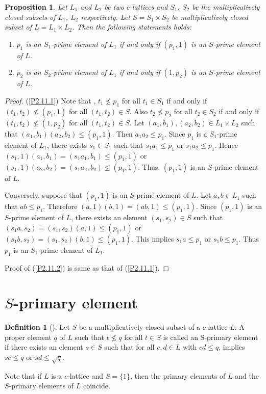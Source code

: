 \documentclass[10pt,twoside,a4paper]{amsart}
\numberwithin{equation}{section}
\theoremstyle{plain}
\newtheorem{prop}[lem]{Proposition}
\theoremstyle{definition}
\newtheorem{defn}[lem]{Definition}
\begin{document}
\begin{prop}%
	Let $L_1$ and $L_2$ be two $c$-lattices and $S_1$, $S_2$ be the multiplicatively closed subsets of $L_1$, $L_2$ respectively. Let $S=S_1\times S_2$ be multiplicatively closed subset of  $L=L_1\times L_2$. Then the following statements holds:
	\begin{enumerate}
		\item\label{P2.11.1} $p_1$ is an $S_1$-prime element of $L_1$ if and only if $(p_1,1)$ is an $S$-prime element of $L$.
		\item\label{P2.11.2} $p_2$ is an $S_2$-prime element of $L_1$ if and only if $(1,p_2)$ is an $S$-prime element of $L$.
	\end{enumerate}
\end{prop}    
\begin{proof} 
	(\ref{P2.11.1})	Note that , $t_1\nleq p_1$ for all $t_1\in S_1$ if and only if $(t_1,t_2)\nleq (p_1,1)$ for all $(t_1,t_2) \in S$. Also $t_2 \nleq p_2$ for all $t_2 \in S_2$ if and only if $(t_1,t_2) \nleq (1,p_2)$ for all $(t_1,t_2) \in S$. Let $(a_1,b_1), (a_2,b_2)\in L_1\times L_2$ such that $(a_1,b_1)(a_2,b_2)\leq (p_1,1)$. Then $a_1a_2\leq p_1$. Since $p_1$ is a $S_1$-prime element of $L_1$, there exists $s_1\in S_1$ such that $s_1a_1\leq p_1$ or $s_1a_2\leq p_1$. Hence $(s_1,1)(a_1,b_1)=(s_1a_1,b_1)\leq (p_1,1)$ or $(s_1,1)(a_2,b_2)=(s_1a_2,b_2)\leq (p_1,1)$. Thus, $(p_1,1)$ is an $S$-prime element of $L$.
	
	Conversely, suppose that $(p_1,1)$ is an $S$-prime element of $L$. Let $a,b\in L_1$ such that $ab\leq p_1$. Therefore $(a,1)(b,1)=(ab,1)\leq (p_1,1)$. Since $(p_1,1)$ is an $S$-prime element of $L$, there exists an element $(s_1,s_2)\in S$ such that $(s_1a,s_2)=(s_1,s_2)(a,1)\leq (p_1,1)$ or $(s_1b,s_2)=(s_1,s_2)(b,1)\leq (p_1,1)$. This implies $s_1a\leq p_1$ or $s_1b\leq p_1$. Thus $p_1$ is an $S_1$-prime element of $L_1$.
	
	Proof of 	(\ref{P2.11.2}) is same as that of  (\ref{P2.11.1}).
\end{proof}	


\section{$S$-primary element}


\begin{defn}[\cite{SPJ2}]
	Let $S$ be a multiplicatively closed subset of a $c$-lattice $L$. A proper element $q$ of $L$ such that $t\nleq q$ for all $t\in S$ is called an S-primary element if there exists an element $s\in S$ such that for all $c,d\in L$ with $cd\leq q$, implies $sc\leq q$ or $sd\leq \sqrt q$.	
	
	Note that if $L$ is a $c$-lattice and $S=\{1\}$, then the primary elements of $L$ and the $S$-primary elements of $L$ coincide.
\end{defn}
\end{document}

